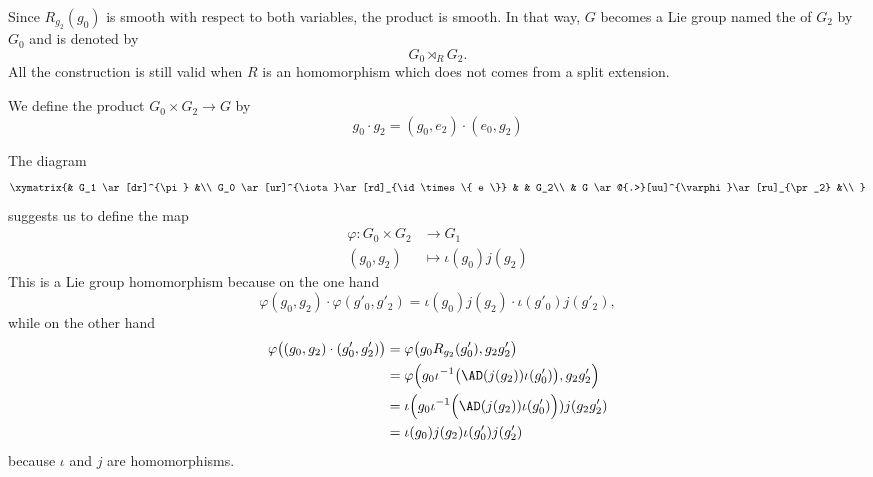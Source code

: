 Since $R_{g_2}(g_0)$ is smooth with respect to both variables, the product is smooth. In that way, $G$ becomes a Lie group named the  of $G_2$ by $G_0$ and is denoted by
\begin{equation}
	G_0 \rtimes_RG_2.
\end{equation}
All the construction is still valid when $R$ is an homomorphism which does not comes from a split extension.

We define the product $G_0\times G_2\to G$ by
\begin{equation}
	g_0\cdot g_2=(g_0,e_2)\cdot(e_0,g_2)
\end{equation}

The diagram
\begin{equation}
	\xymatrix{%
		&       G_1 \ar[dr]^{\pi}           &\\
		G_0 \ar[ur]^{\iota}\ar[rd]_{\id\times\{ e \}}   &       & G_2\\
		&       G \ar@{.>}[uu]^{\varphi}\ar[ru]_{\pr_2}     &\\
	}
\end{equation}
suggests us to define the map
\begin{equation}
	\begin{aligned}
		\varphi\colon G_0\times G_2 & \to G_1                  \\
		(g_0,g_2)                   & \mapsto \iota(g_0)j(g_2)
	\end{aligned}
\end{equation}
This is a Lie group homomorphism because on the one hand
\begin{equation}
	\varphi(g_0,g_2)\cdot \varphi(g'_0,g'_2)=\iota(g_0)j(g_2)\cdot \iota(g'_0)j(g'_2),
\end{equation}
while on the other hand
\begin{equation}
	\begin{aligned}[]
		\varphi\big( (g_0,g_2)\cdot (g'_0,g'_2) \big) & =\varphi\big( g_0R_{g_2}(g'_0),g_2g'_2 \big)                                \\
		                                              & =\varphi\Big( g_0\iota^{-1}\big( \AD(j(g_2))\iota(g'_0) \big),g_2g'_2 \Big) \\
		                                              & =\iota\Big(g_0\iota^{-1}\Big( \AD(j(g_2))\iota(g'_0) \Big))j(g_2g'_2)       \\
		                                              & =\iota(g_0)j(g_2)\iota(g'_0)j(g'_2)
	\end{aligned}
\end{equation}
because $\iota$ and $j$ are homomorphisms.

